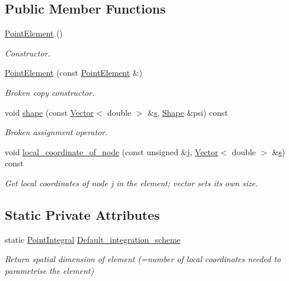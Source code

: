 \subsection*{Public Member Functions}
\begin{DoxyCompactItemize}
\item 
\hyperlink{classoomph_1_1PointElement_a08937a79fd45c5efd205a0e7535ef1cf}{Point\+Element} ()
\begin{DoxyCompactList}\small\item\em Constructor. \end{DoxyCompactList}\item 
\hyperlink{classoomph_1_1PointElement_a46f7527a4cc666d050f72cefa4a340d1}{Point\+Element} (const \hyperlink{classoomph_1_1PointElement}{Point\+Element} \&)
\begin{DoxyCompactList}\small\item\em Broken copy constructor. \end{DoxyCompactList}\item 
void \hyperlink{classoomph_1_1PointElement_a27f0b22c4f5aae72b0223748b5cb1185}{shape} (const \hyperlink{classoomph_1_1Vector}{Vector}$<$ double $>$ \&\hyperlink{cfortran_8h_ab7123126e4885ef647dd9c6e3807a21c}{s}, \hyperlink{classoomph_1_1Shape}{Shape} \&psi) const
\begin{DoxyCompactList}\small\item\em Broken assignment operator. \end{DoxyCompactList}\item 
void \hyperlink{classoomph_1_1PointElement_ac25e0eb9aa65e8b90ef4907942e2c87f}{local\+\_\+coordinate\+\_\+of\+\_\+node} (const unsigned \&j, \hyperlink{classoomph_1_1Vector}{Vector}$<$ double $>$ \&\hyperlink{cfortran_8h_ab7123126e4885ef647dd9c6e3807a21c}{s}) const
\begin{DoxyCompactList}\small\item\em Get local coordinates of node j in the element; vector sets its own size. \end{DoxyCompactList}\end{DoxyCompactItemize}
\subsection*{Static Private Attributes}
\begin{DoxyCompactItemize}
\item 
static \hyperlink{classoomph_1_1PointIntegral}{Point\+Integral} \hyperlink{classoomph_1_1PointElement_a812180fd4abef76f519f07fa5ca01401}{Default\+\_\+integration\+\_\+scheme}
\begin{DoxyCompactList}\small\item\em Return spatial dimension of element (=number of local coordinates needed to parametrise the element) \end{DoxyCompactList}\end{DoxyCompactItemize}
